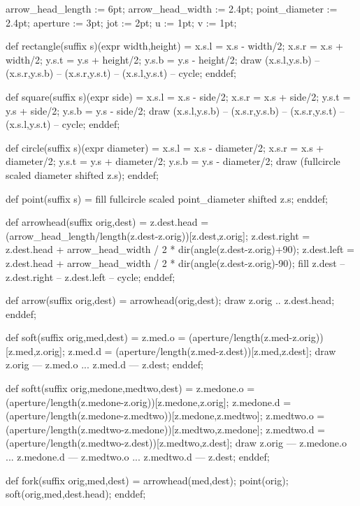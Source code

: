 arrow_head_length := 6pt; arrow_head_width := 2.4pt;
point_diameter := 2.4pt; aperture := 3pt; jot := 2pt;
u := 1pt; v := 1pt;

def rectangle(suffix s)(expr width,height) =
 x.s.l = x.s - width/2;
 x.s.r = x.s + width/2;
 y.s.t = y.s + height/2;
 y.s.b = y.s - height/2;
 draw (x.s.l,y.s.b) -- (x.s.r,y.s.b) --
  (x.s.r,y.s.t) -- (x.s.l,y.s.t) -- cycle;
enddef;

def square(suffix s)(expr side) =
 x.s.l = x.s - side/2;
 x.s.r = x.s + side/2;
 y.s.t = y.s + side/2;
 y.s.b = y.s - side/2;
 draw (x.s.l,y.s.b) -- (x.s.r,y.s.b) --
  (x.s.r,y.s.t) -- (x.s.l,y.s.t) -- cycle;
enddef;

def circle(suffix s)(expr diameter) =
 x.s.l = x.s - diameter/2;
 x.s.r = x.s + diameter/2;
 y.s.t = y.s + diameter/2;
 y.s.b = y.s - diameter/2;
 draw (fullcircle scaled diameter shifted z.s);
enddef;


def point(suffix s) =
 fill fullcircle scaled point_diameter shifted z.s;
enddef;


def arrowhead(suffix orig,dest) =
 z.dest.head  = (arrow_head_length/length(z.dest-z.orig))[z.dest,z.orig];
 z.dest.right = z.dest.head + arrow_head_width / 2 *
                dir(angle(z.dest-z.orig)+90);
 z.dest.left  = z.dest.head + arrow_head_width / 2 *
                dir(angle(z.dest-z.orig)-90);
 fill z.dest -- z.dest.right -- z.dest.left -- cycle;
enddef;

def arrow(suffix orig,dest) =
 arrowhead(orig,dest); draw z.orig .. z.dest.head;
enddef;


def soft(suffix orig,med,dest) =
 z.med.o = (aperture/length(z.med-z.orig))[z.med,z.orig];
 z.med.d = (aperture/length(z.med-z.dest))[z.med,z.dest];
 draw z.orig --- z.med.o ... z.med.d --- z.dest;
enddef;

def softt(suffix orig,medone,medtwo,dest) =
 z.medone.o = (aperture/length(z.medone-z.orig))[z.medone,z.orig];
 z.medone.d = (aperture/length(z.medone-z.medtwo))[z.medone,z.medtwo];
 z.medtwo.o = (aperture/length(z.medtwo-z.medone))[z.medtwo,z.medone];
 z.medtwo.d = (aperture/length(z.medtwo-z.dest))[z.medtwo,z.dest];
 draw z.orig --- z.medone.o ... z.medone.d
  --- z.medtwo.o ... z.medtwo.d --- z.dest;
enddef;

def fork(suffix orig,med,dest) =
 arrowhead(med,dest); point(orig); soft(orig,med,dest.head);
enddef;

